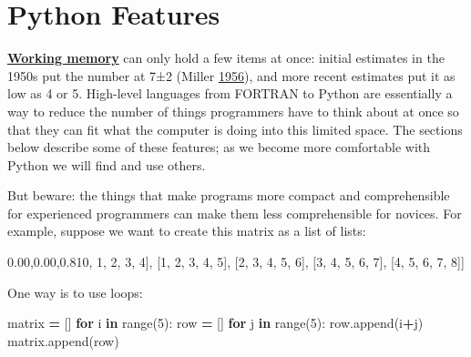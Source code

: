 \documentclass[
]{krantz}
\makeatletter
\newenvironment{Shaded}{\begin{snugshade}}{\end{snugshade}}
\newcommand{\BuiltInTok}[1]{#1}
\newcommand{\ControlFlowTok}[1]{\textcolor[rgb]{0.13,0.29,0.53}{\textbf{#1}}}
\newcommand{\DecValTok}[1]{\textcolor[rgb]{0.00,0.00,0.81}{#1}}
\newcommand{\KeywordTok}[1]{\textcolor[rgb]{0.13,0.29,0.53}{\textbf{#1}}}
\newcommand{\NormalTok}[1]{#1}
\newcommand{\OperatorTok}[1]{\textcolor[rgb]{0.81,0.36,0.00}{\textbf{#1}}}
\newenvironment{kframe}{%
\medskip{}
\setlength{\fboxsep}{.8em}
 \def\at@end@of@kframe{}%
 \ifinner\ifhmode%
  \def\at@end@of@kframe{\end{minipage}}%
  \begin{minipage}{\columnwidth}%
 \fi\fi%
 \def\FrameCommand##1{\hskip\@totalleftmargin \hskip-\fboxsep
 \colorbox{shadecolor}{##1}\hskip-\fboxsep
     \hskip-\linewidth \hskip-\@totalleftmargin \hskip\columnwidth}%
 \MakeFramed {\advance\hsize-\width
   \@totalleftmargin\z@ \linewidth\hsize
   \@setminipage}}%
 {\par\unskip\endMakeFramed%
 \at@end@of@kframe}
\renewenvironment{Shaded}{\begin{kframe}}{\end{kframe}}
\newcommand{\gref}[2]{\hyperlink{#2}{\textbf{#1}}}
\makeatother
\begin{document}
\hypertarget{style-features}{%
\section{Python Features}\label{style-features}}

\gref{Working memory}{working\_memory} can only hold a few items at once:
initial estimates in the 1950s put the number at 7±2 (Miller \protect\hyperlink{ref-Mill1956}{1956}),
and more recent estimates put it as low as 4 or 5.
High-level languages from FORTRAN to Python
are essentially a way to reduce the number of things programmers have to think about at once
so that they can fit what the computer is doing into this limited space.
The sections below describe some of these features;
as we become more comfortable with Python we will find and use others.

But beware:
the things that make programs more compact and comprehensible for experienced programmers
can make them less comprehensible for novices.
For example,
suppose we want to create this matrix as a list of lists:

\begin{Shaded}
\begin{Highlighting}[]
\NormalTok{[[}\DecValTok{0}\NormalTok{, }\DecValTok{1}\NormalTok{, }\DecValTok{2}\NormalTok{, }\DecValTok{3}\NormalTok{, }\DecValTok{4}\NormalTok{],}
\NormalTok{ [}\DecValTok{1}\NormalTok{, }\DecValTok{2}\NormalTok{, }\DecValTok{3}\NormalTok{, }\DecValTok{4}\NormalTok{, }\DecValTok{5}\NormalTok{],}
\NormalTok{ [}\DecValTok{2}\NormalTok{, }\DecValTok{3}\NormalTok{, }\DecValTok{4}\NormalTok{, }\DecValTok{5}\NormalTok{, }\DecValTok{6}\NormalTok{],}
\NormalTok{ [}\DecValTok{3}\NormalTok{, }\DecValTok{4}\NormalTok{, }\DecValTok{5}\NormalTok{, }\DecValTok{6}\NormalTok{, }\DecValTok{7}\NormalTok{],}
\NormalTok{ [}\DecValTok{4}\NormalTok{, }\DecValTok{5}\NormalTok{, }\DecValTok{6}\NormalTok{, }\DecValTok{7}\NormalTok{, }\DecValTok{8}\NormalTok{]]}
\end{Highlighting}
\end{Shaded}

One way is to use loops:

\begin{Shaded}
\begin{Highlighting}[]
\NormalTok{matrix }\OperatorTok{=}\NormalTok{ []}
\ControlFlowTok{for}\NormalTok{ i }\KeywordTok{in} \BuiltInTok{range}\NormalTok{(}\DecValTok{5}\NormalTok{):}
\NormalTok{    row }\OperatorTok{=}\NormalTok{ []}
    \ControlFlowTok{for}\NormalTok{ j }\KeywordTok{in} \BuiltInTok{range}\NormalTok{(}\DecValTok{5}\NormalTok{):}
\NormalTok{        row.append(i}\OperatorTok{+}\NormalTok{j)}
\NormalTok{    matrix.append(row)}
\end{Highlighting}
\end{Shaded}
\end{document}

